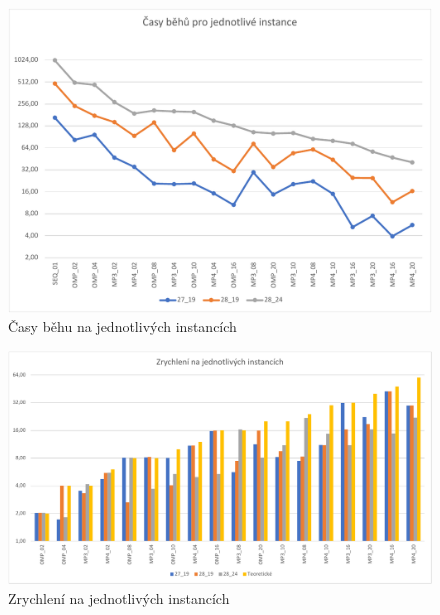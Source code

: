 \begin{figure}[H]
    \centering
    \includegraphics[width=\textwidth]{fig/4_1.pdf}
    \caption{Časy běhu na jednotlivých instancích}
    \label{4_timesgraph}
\end{figure}

\begin{figure}[H]
    \centering
    \includegraphics[width=\textwidth]{fig/4_2.pdf}
    \caption{Zrychlení na jednotlivých instancích}
    \label{4_speedup}
\end{figure}
